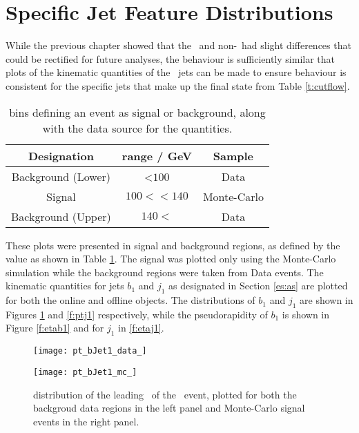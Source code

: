 \section{Specific Jet Feature Distributions}

	While the previous chapter showed that the \bjets\ and non-\bjets\ had slight differences that could be rectified for future analyses, the behaviour is sufficiently similar that plots of the kinematic quantities of the \VBFHBB\ jets can be made to ensure behaviour is consistent for the specific jets that make up the final state from Table \ref{t:cutflow}.

	\begin{table}[h]
		\caption[Signal/Background definition \mbb values]{\mbb bins defining an event as signal or background, along with the data source for the quantities.}
		\label{t:signalback}
		\medskip
		\centering
		\begin{tabular}{ccc}\toprule
			Designation & \mbb range / GeV & Sample \\\midrule
			Background (Lower) & \mbb<$100$ & Data \\
			Signal & $100<$\mbb$<140$ & Monte-Carlo \\
			Background (Upper) &  $140<$\mbb & Data \\
			\bottomrule
		\end{tabular}
	\end{table}

	These plots were presented in signal and background regions, as defined by the \mbb value as shown in Table \ref{t:signalback}. The signal was plotted only using the Monte-Carlo simulation while the background regions were taken from Data events. The kinematic quantities for jets $b_1$ and $j_1$ as designated in Section \ref{es:as} are plotted for both the online and offline objects. The \pt distributions of $b_1$ and $j_1$ are shown in Figures \ref{f:ptb1} and \ref{f:ptj1} respectively, while the pseudorapidity of $b_1$ is shown in Figure \ref{f:etab1} and for $j_1$ in \ref{f:etaj1}.

		\begin{figure}[h]
			\centering

			\begin{minipage}[h]{0.48\linewidth}
				\texttt{[image: pt\_bJet1\_data\_]}
			\end{minipage}
			\quad
			\begin{minipage}[h]{0.48\linewidth}
				\texttt{[image: pt\_bJet1\_mc\_]}
			\end{minipage}
			\label{f:ptb1}
			\caption[\pt distribution of the leading \bjet\ of the \VBFHBB\ event]{\pt distribution of the leading \bjet\ of the \VBFHBB\ event, plotted for both the backgroud data regions in the left panel and Monte-Carlo signal events in the right panel.}
		\end{figure}

